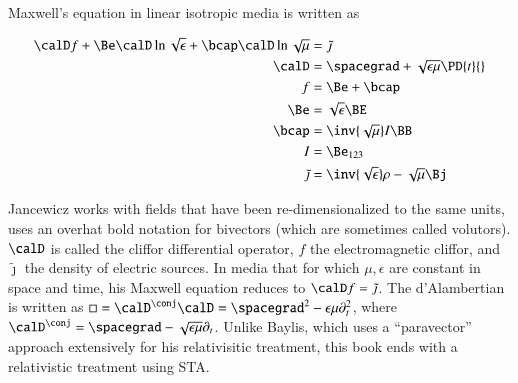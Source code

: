 Maxwell's equation in linear isotropic media is written as

\begin{dmath}\label{eqn:galiterature:20}
\begin{aligned}
\calD f + \Be \calD \ln \sqrt{\epsilon} + \bcap \calD \ln \sqrt{\mu} &= \tilde{\jmath} \\
\calD &= \spacegrad + \sqrt{\epsilon\mu} \PD{t}{} \\
f &= \Be + \bcap \\
\Be &= \sqrt{\epsilon} \BE \\
\bcap &= \inv{\sqrt{\mu}} I \BB \\
I &= \Be_{123} \\
\tilde{\jmath} &= \inv{\sqrt{\epsilon}}\rho - \sqrt{\mu} \Bj \\
\end{aligned}
\end{dmath}

Jancewicz works with fields that have been re-dimensionalized to the same units, uses an overhat bold notation for bivectors (which are sometimes called volutors).
\( \calD \) is called the cliffor differential operator, \( f \) the electromagnetic cliffor, and \( \tilde{\jmath} \) the density of electric sources.
In media that for which \( \mu, \epsilon \) are constant in space and time, his Maxwell equation reduces to \( \calD f = \tilde{\jmath} \).
The d'Alambertian is written
as \( \Box = \calD^\conj \calD = \spacegrad^2 - \epsilon\mu \partial_t^2 \), where
\( \calD^\conj = \spacegrad - \sqrt{\epsilon\mu} \partial_t \).
Unlike Baylis, which uses a
``paravector'' approach extensively for his relativisitic treatment,
this book ends with a relativistic treatment using STA.

